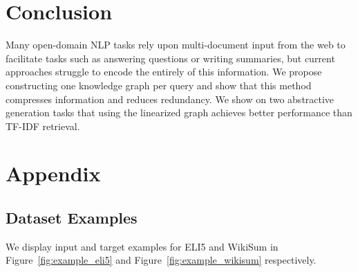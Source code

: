 \documentclass[11pt,a4paper]{article}
\begin{document}
\section{Conclusion} 

Many open-domain NLP tasks rely upon multi-document input from the web to facilitate tasks such as answering questions or writing summaries, but current approaches struggle to encode the entirely of this information. We propose constructing one knowledge graph per query and show that this method compresses information and reduces redundancy. We show on two abstractive generation tasks that using the linearized graph achieves better performance than TF-IDF retrieval. 




\clearpage
\newpage 
\section{Appendix}

\subsection{Dataset Examples}

We display input and target examples for ELI5 and WikiSum in Figure~\ref{fig:example_eli5} and Figure~\ref{fig:example_wikisum} respectively.
\end{document}
